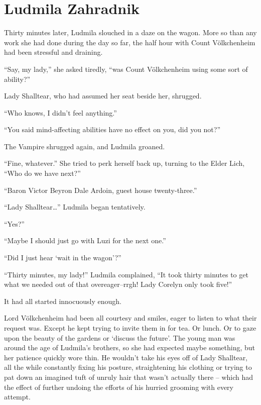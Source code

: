\chapter{Ludmila Zahradnik}

Thirty minutes later, Ludmila slouched in a daze on the wagon. More so than any work she had done during the day so far, the half hour with Count Völkchenheim had been stressful and draining.

 

“Say, my lady,” she asked tiredly, “was Count Völkchenheim using some sort of ability?”

 

Lady Shalltear, who had assumed her seat beside her, shrugged.

 

“Who knows, I didn’t feel anything.”

 

“You said mind-affecting abilities have no effect on you, did you not?”

 

The Vampire shrugged again, and Ludmila groaned.

 

“Fine, whatever.” She tried to perk herself back up, turning to the Elder Lich, “Who do we have next?”

 

“Baron Victor Beyron Dale Ardoin, guest house twenty-three.”

 

“Lady Shalltear…” Ludmila began tentatively.

 

“Yes?”

 

“Maybe I should just go with Luzi for the next one.”

 

“Did I just hear ‘wait in the wagon’?”

 

“Thirty minutes, my lady!” Ludmila complained, “It took thirty minutes to get what we needed out of that overeager–rrgh! Lady Corelyn only took five!”

 

It had all started innocuously enough.

 

Lord Völkchenheim had been all courtesy and smiles, eager to listen to what their request was. Except he kept trying to invite them in for tea. Or lunch. Or to gaze upon the beauty of the gardens or ‘discuss the future’. The young man was around the age of Ludmila’s brothers, so she had expected maybe something, but her patience quickly wore thin. He wouldn’t take his eyes off of Lady Shalltear, all the while constantly fixing his posture, straightening his clothing or trying to pat down an imagined tuft of unruly hair that wasn’t actually there – which had the effect of further undoing the efforts of his hurried grooming with every attempt.

